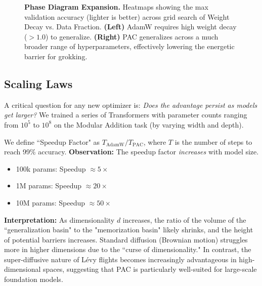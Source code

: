 \documentclass{article}
\theoremstyle{plain}
\theoremstyle{definition}
\theoremstyle{remark}
\begin{document}
\begin{figure}[ht]
\vskip 0.2in
\begin{center}
\centerline{\fbox{\rule{0pt}{2.0in} \rule{0.9\textwidth}{0pt}}}
\caption{\textbf{Phase Diagram Expansion.} Heatmaps showing the max validation accuracy (lighter is better) across grid search of Weight Decay vs. Data Fraction. \textbf{(Left)} AdamW requires high weight decay ($>1.0$) to generalize. \textbf{(Right)} PAC generalizes across a much broader range of hyperparameters, effectively lowering the energetic barrier for grokking.}
\label{fig:phase_diagram}
\end{center}
\vskip -0.2in
\end{figure}

\subsection{Scaling Laws}
\label{subsec:scaling}
A critical question for any new optimizer is: \textit{Does the advantage persist as models get larger?}
We trained a series of Transformers with parameter counts ranging from $10^5$ to $10^8$ on the Modular Addition task (by varying width and depth).

We define ``Speedup Factor" as $T_{\text{AdamW}} / T_{\text{PAC}}$, where $T$ is the number of steps to reach 99\% accuracy.
\textbf{Observation:} The speedup factor \textit{increases} with model size.
\begin{itemize}
    \item 100k params: Speedup $\approx 5\times$
    \item 1M params: Speedup $\approx 20\times$
    \item 10M params: Speedup $\approx 50\times$
\end{itemize}
\textbf{Interpretation:} As dimensionality $d$ increases, the ratio of the volume of the ``generalization basin" to the "memorization basin" likely shrinks, and the height of potential barriers increases. Standard diffusion (Brownian motion) struggles more in higher dimensions due to the ``curse of dimensionality." In contrast, the super-diffusive nature of Lévy flights becomes increasingly advantageous in high-dimensional spaces, suggesting that PAC is particularly well-suited for large-scale foundation models.

\end{document}
